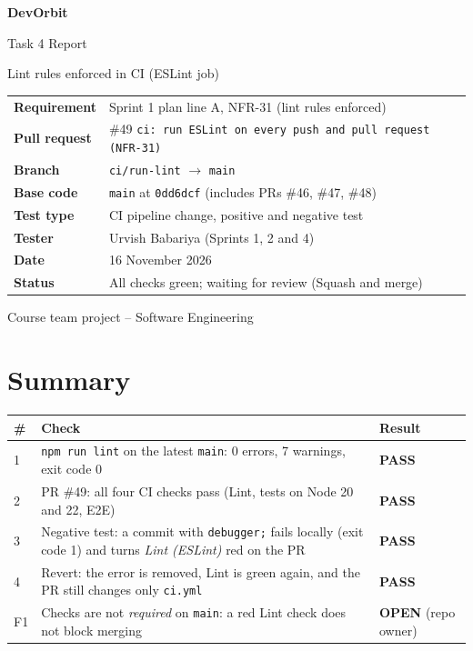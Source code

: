 \documentclass[11pt,a4paper]{article}
\newcommand{\PASS}{\textbf{\textcolor{passgreen}{PASS}}}
\newcommand{\OPEN}{\textbf{\textcolor{pendorange}{OPEN}}}
\begin{document}
\begin{titlepage}\centering
  \vspace*{2.5cm}
  {\Huge\bfseries\color{accent} DevOrbit\par}\vspace{0.6cm}
  {\LARGE Task 4 Report\par}\vspace{0.3cm}
  {\Large Lint rules enforced in CI (ESLint job)\par}\vspace{1.5cm}
  \begin{tabular}{>{\bfseries}l l}
    Requirement   & Sprint 1 plan line A, NFR-31 (lint rules enforced) \\
    Pull request  & \#49 \texttt{ci: run ESLint on every push and pull request (NFR-31)} \\
    Branch        & \texttt{ci/run-lint} $\rightarrow$ \texttt{main} \\
    Base code     & \texttt{main} at \texttt{0dd6dcf} (includes PRs \#46, \#47, \#48) \\
    Test type     & CI pipeline change, positive and negative test \\
    Tester        & Urvish Babariya (Sprints 1, 2 and 4) \\
    Date          & 16 November 2026 \\
    Status        & All checks green; waiting for review (Squash and merge) \\
  \end{tabular}
  \vfill{\small Course team project -- Software Engineering\par}
\end{titlepage}
\tableofcontents\newpage

\section{Summary}
\begin{center}
\begin{tabularx}{\linewidth}{l X l}\toprule
\textbf{\#} & \textbf{Check} & \textbf{Result}\\\midrule
1 & \texttt{npm run lint} on the latest \texttt{main}: 0 errors, 7 warnings, exit code 0 & \PASS\\
2 & PR \#49: all four CI checks pass (Lint, tests on Node 20 and 22, E2E) & \PASS\\
3 & Negative test: a commit with \texttt{debugger;} fails locally (exit code 1) and turns \emph{Lint (ESLint)} red on the PR & \PASS\\
4 & Revert: the error is removed, Lint is green again, and the PR still changes only \texttt{ci.yml} & \PASS\\
F1 & Checks are not \emph{required} on \texttt{main}: a red Lint check does not block merging & \OPEN{} (repo owner)\\
\bottomrule\end{tabularx}\end{center}
\end{document}
